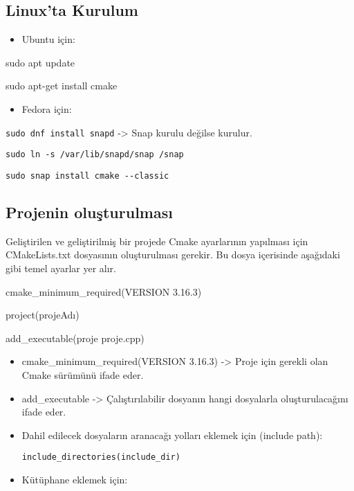 \documentclass[
]{book}
\newenvironment{Shaded}{\begin{snugshade}}{\end{snugshade}}
\newcommand{\ExtensionTok}[1]{#1}
\newcommand{\FunctionTok}[1]{\textcolor[rgb]{0.00,0.00,0.00}{#1}}
\newcommand{\NormalTok}[1]{#1}
\providecommand{\tightlist}{%
  \setlength{\itemsep}{0pt}\setlength{\parskip}{0pt}}
\begin{document}
\hypertarget{linuxta-kurulum}{%
\subsection{Linux'ta Kurulum}\label{linuxta-kurulum}}

\begin{itemize}
\tightlist
\item
  Ubuntu için:
\end{itemize}

\begin{Shaded}
\begin{Highlighting}[]
\FunctionTok{sudo}\NormalTok{ apt update }

\FunctionTok{sudo}\NormalTok{ apt{-}get install cmake }
\end{Highlighting}
\end{Shaded}

\begin{itemize}
\tightlist
\item
  Fedora için:
\end{itemize}

\texttt{sudo\ dnf\ install\ snapd} -\textgreater{} Snap kurulu değilse kurulur.

\texttt{sudo\ ln\ -s\ /var/lib/snapd/snap\ /snap}

\texttt{sudo\ snap\ install\ cmake\ -\/-classic}

\hypertarget{projenin-oluux15fturulmasux131}{%
\subsection{Projenin oluşturulması}\label{projenin-oluux15fturulmasux131}}

Geliştirilen ve geliştirilmiş bir projede Cmake ayarlarının yapılması için CMakeLists.txt dosyasının oluşturulması gerekir.
Bu dosya içerisinde aşağıdaki gibi temel ayarlar yer alır.

\begin{Shaded}
\begin{Highlighting}[]
\ExtensionTok{cmake\_minimum\_required}\NormalTok{(VERSION 3.16.3) }

\ExtensionTok{project}\NormalTok{(projeAdı)}

\ExtensionTok{add\_executable}\NormalTok{(proje proje.cpp) }
\end{Highlighting}
\end{Shaded}

\begin{itemize}
\item
  cmake\_minimum\_required(VERSION 3.16.3) -\textgreater{} Proje için gerekli olan Cmake sürümünü
  ifade eder.
\item
  add\_executable -\textgreater{} Çalıştırılabilir dosyanın hangi dosyalarla oluşturulacağını ifade eder.
\item
  Dahil edilecek dosyaların aranacağı yolları eklemek için (include path):

  \texttt{include\_directories(include\_dir)}
\item
  Kütüphane eklemek için:
\end{itemize}
\end{document}

